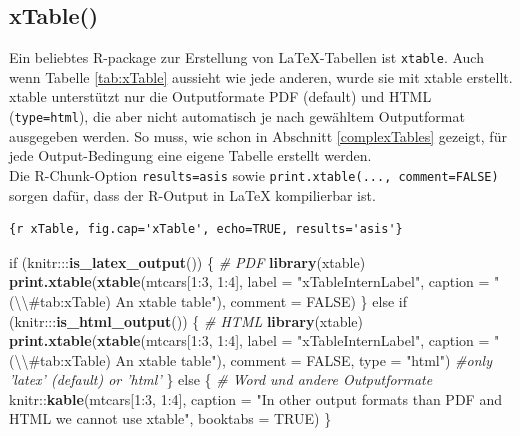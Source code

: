 \documentclass[]{book}
\makeatletter
\newenvironment{Shaded}{\begin{snugshade}}{\end{snugshade}}
\newcommand{\KeywordTok}[1]{\textcolor[rgb]{0.13,0.29,0.53}{\textbf{{#1}}}}
\newcommand{\DataTypeTok}[1]{\textcolor[rgb]{0.13,0.29,0.53}{{#1}}}
\newcommand{\DecValTok}[1]{\textcolor[rgb]{0.00,0.00,0.81}{{#1}}}
\newcommand{\CharTok}[1]{\textcolor[rgb]{0.31,0.60,0.02}{{#1}}}
\newcommand{\StringTok}[1]{\textcolor[rgb]{0.31,0.60,0.02}{{#1}}}
\newcommand{\CommentTok}[1]{\textcolor[rgb]{0.56,0.35,0.01}{\textit{{#1}}}}
\newcommand{\OtherTok}[1]{\textcolor[rgb]{0.56,0.35,0.01}{{#1}}}
\newcommand{\NormalTok}[1]{{#1}}
\newenvironment{kframe}{%
\medskip{}
\setlength{\fboxsep}{.8em}
 \def\at@end@of@kframe{}%
 \ifinner\ifhmode%
  \def\at@end@of@kframe{\end{minipage}}%
  \begin{minipage}{\columnwidth}%
 \fi\fi%
 \def\FrameCommand##1{\hskip\@totalleftmargin \hskip-\fboxsep
 \colorbox{shadecolor}{##1}\hskip-\fboxsep
     \hskip-\linewidth \hskip-\@totalleftmargin \hskip\columnwidth}%
 \MakeFramed {\advance\hsize-\width
   \@totalleftmargin\z@ \linewidth\hsize
   \@setminipage}}%
 {\par\unskip\endMakeFramed%
 \at@end@of@kframe}
\renewenvironment{Shaded}{\begin{kframe}}{\end{kframe}}
\theoremstyle{definition}
\theoremstyle{definition}
\theoremstyle{remark}
\makeatother
\begin{document}
\subsection{xTable()}\label{xTable}

Ein beliebtes R-package zur Erstellung von LaTeX-Tabellen ist
\texttt{xtable}. Auch wenn Tabelle \ref{tab:xTable} aussieht wie jede
anderen, wurde sie mit xtable erstellt.\\
xtable unterstützt nur die Outputformate PDF (default) und HTML
(\texttt{type=\textquotesingle{}html\textquotesingle{}}), die aber nicht
automatisch je nach gewähltem Outputformat ausgegeben werden. So muss,
wie schon in Abschnitt \ref{complexTables} gezeigt, für jede
Output-Bedingung eine eigene Tabelle erstellt werden.\\
Die R-Chunk-Option
\texttt{results=\textquotesingle{}asis\textquotesingle{}} sowie
\texttt{print.xtable(...,\ comment=FALSE)} sorgen dafür, dass der
R-Output in LaTeX kompilierbar ist.

\begin{verbatim}
{r xTable, fig.cap='xTable', echo=TRUE, results='asis'}
\end{verbatim}

\begin{Shaded}
\begin{Highlighting}[]
\NormalTok{if (knitr:::}\KeywordTok{is_latex_output}\NormalTok{()) \{}
    \CommentTok{# PDF}
    \KeywordTok{library}\NormalTok{(xtable)}
    \KeywordTok{print.xtable}\NormalTok{(}\KeywordTok{xtable}\NormalTok{(mtcars[}\DecValTok{1}\NormalTok{:}\DecValTok{3}\NormalTok{, }\DecValTok{1}\NormalTok{:}\DecValTok{4}\NormalTok{], }\DataTypeTok{label =} \StringTok{"xTableInternLabel"}\NormalTok{, }\DataTypeTok{caption =} \StringTok{"(}\CharTok{\textbackslash{}\textbackslash{}}\StringTok{#tab:xTable) An xtable table"}\NormalTok{), }
        \DataTypeTok{comment =} \OtherTok{FALSE}\NormalTok{)}
\NormalTok{\} else if (knitr:::}\KeywordTok{is_html_output}\NormalTok{()) \{}
    \CommentTok{# HTML}
    \KeywordTok{library}\NormalTok{(xtable)}
    \KeywordTok{print.xtable}\NormalTok{(}\KeywordTok{xtable}\NormalTok{(mtcars[}\DecValTok{1}\NormalTok{:}\DecValTok{3}\NormalTok{, }\DecValTok{1}\NormalTok{:}\DecValTok{4}\NormalTok{], }\DataTypeTok{label =} \StringTok{"xTableInternLabel"}\NormalTok{, }\DataTypeTok{caption =} \StringTok{"(}\CharTok{\textbackslash{}\textbackslash{}}\StringTok{#tab:xTable) An xtable table"}\NormalTok{), }
        \DataTypeTok{comment =} \OtherTok{FALSE}\NormalTok{, }\DataTypeTok{type =} \StringTok{"html"}\NormalTok{)  }\CommentTok{#only 'latex' (default) or 'html'}
\NormalTok{\} else \{}
    \CommentTok{# Word und andere Outputformate}
    \NormalTok{knitr::}\KeywordTok{kable}\NormalTok{(mtcars[}\DecValTok{1}\NormalTok{:}\DecValTok{3}\NormalTok{, }\DecValTok{1}\NormalTok{:}\DecValTok{4}\NormalTok{], }\DataTypeTok{caption =} \StringTok{"In other output formats than PDF and HTML we cannot use xtable"}\NormalTok{, }
        \DataTypeTok{booktabs =} \OtherTok{TRUE}\NormalTok{)}
\NormalTok{\}}
\end{Highlighting}
\end{Shaded}
\end{document}
